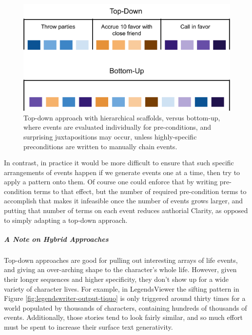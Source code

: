 \begin{figure}
    \centering
    \includegraphics[width=\textwidth]{figures/4-Delve/two-strategies.png}
    \caption{Top-down approach with hierarchical scaffolds, versus bottom-up, where events are evaluated individually for pre-conditions, and surprising juxtapositions may occur, unless highly-specific preconditions are written to manually chain events.}
    \label{fig:two-strategies}
\end{figure}


In contrast, in practice it would be more difficult to ensure that such specific arrangements of events happen if we generate events one at a time, then try to apply a pattern onto them. Of course one could enforce that by writing pre-condition terms to that effect, but the number of required pre-condition terms to accomplish that makes it infeasible once the number of events grows larger, and putting that number of terms on each event reduces authorial Clarity, as opposed to simply adapting a top-down approach.

\subparagraph{A Note on Hybrid Approaches}\label{subpar:a-note-on-hybrid-approaches}

Top-down approaches are good for pulling out interesting arrays of life events, and giving an over-arching shape to the character's whole life. However, given their longer sequences and higher specificity, they don’t show up for a wide variety of character lives. For example, in LegendsViewer the sifting pattern in Figure \ref{fig:legendswriter-output-tiquo} is only triggered around thirty times for a world populated by thousands of characters, containing hundreds of thousands of events. Additionally, those stories tend to look fairly similar, and so much effort must be spent to increase their surface text generativity.
 
